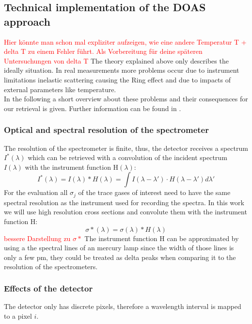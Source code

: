 \documentclass  [
  paper    = a4,
  BCOR     = 10mm,
  twoside,
  fontsize = 12pt,
  fleqn,
  toc      = bibnumbered,
  toc      = listofnumbered,
  numbers  = noendperiod,
  headings = normal,
  listof   = leveldown,
  version  = 3.03
]                                       {scrreprt}
\begin{document}
	
	\subsection{Technical implementation of the DOAS approach}
	\textcolor{red}{Hier könnte man schon mal expliziter aufzeigen, wie eine andere Temperatur T + delta T zu einem Fehler führt. Als Vorbereitung für deine späteren Untersuchungen von delta T}
	The theory explained above only describes the ideally situation. In real measurements more problems occur due to instrument limitations inelastic scattering causing the Ring effect and due to impacts of external parameters like temperature.\\
	In the following a short overview about these problems and their consequences for our retrieval is given. Further information can be found in \cite{lubcke2014optical}.\\
	\subsubsection*{Optical and spectral resolution of the spectrometer}
	The resolution of the spectrometer is finite, thus, the detector receives a spectrum $I^{*}\left(\lambda\right)$ which can be retrieved with a convolution of the incident spectrum $I\left(\lambda\right)$ with the instrument function H$\left(\lambda\right)$:
	\begin{equation}
	I^{*}\left(\lambda\right) = I\left(\lambda\right)*H\left(\lambda\right)=\int I\left(\lambda-\lambda{'}\right)\cdot H\left(\lambda-\lambda{'}\right)d\lambda{'}
	\end{equation} 
	For the evaluation all $\sigma_{j}$  of the trace gases of interest need to have the same spectral resolution as the instrument used for recording the spectra. In this work we will use high resolution cross sections and convolute them with the instrument function H:
	\begin{equation}
	\sigma{*}\left(\lambda\right) = \sigma\left(\lambda\right)*H\left(\lambda\right)
	\end{equation}
	\textcolor{red}{bessere Darstellung zu $\sigma{*}$}
	The instrument function H can be approximated by using a the spectral lines of an mercury lamp since the width of those lines is only a few pm, they could be treated as delta peaks when comparing it to the resolution of the spectrometers.
	
	\subsubsection*{Effects of the detector}
	The detector only has discrete pixels, therefore a wavelength interval is mapped to a pixel $i$.
	
\end{document}
